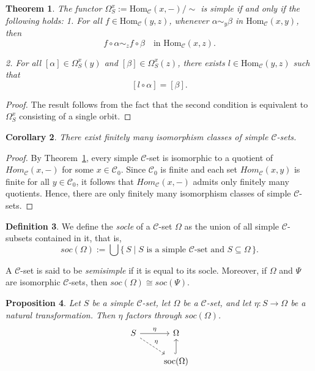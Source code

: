 \documentclass[a4paper]{article}
\newtheorem{thm}{Theorem}[section]
\newtheorem{cor}[thm]{Corollary}
\newtheorem{prop}[thm]{Proposition}
\theoremstyle{definition}
\newtheorem{defi}[thm]{Definition}
\theoremstyle{remark}
\newcommand*{\cat}[1]{\mathcal{#1}}
\begin{document}
\begin{thm} \label{simple ang quotinet}
 The functor \(\Omega_S^x := \mathrm{Hom}_{\mathcal{C}}(x,{-})/\sim\) is simple if and only if the following holds:
1. For all \(f \in \mathrm{Hom}_{\mathcal{C}}(y,z)\), whenever \(\alpha \sim_y \beta\) in \(\mathrm{Hom}_{\mathcal{C}}(x,y)\), then
\[
f \circ \alpha \sim_z f \circ \beta \quad \text{in } \mathrm{Hom}_{\mathcal{C}}(x,z).
\]

2. For all \([\alpha] \in \Omega_S^x(y)\) and \([\beta] \in \Omega_S^x(z)\), there exists \(l \in \mathrm{Hom}_{\mathcal{C}}(y,z)\) such that
\[
[l \circ \alpha] = [\beta].
\]

\end{thm}
\begin{proof}
The result follows from the fact that the second condition is equivalent to $\Omega_S^x$ consisting of a single orbit.
\end{proof}
\begin{cor}
There exist finitely many isomorphism classes of simple $\cat{C}$-sets.
\end{cor}
\begin{proof}
By Theorem~\ref{simple ang quotinet}, every simple $\cat{C}$-set is isomorphic to a quotient of \- 
$ Hom_{\cat{C}}(x,-)$ for some $x \in \cat{C}_0$. Since $\cat{C}_0$ is finite and each set $Hom_{\cat{C}}(x,y)$ is finite for all $y \in \cat{C}_0$, it follows that $Hom_{\cat{C}}(x,-)$ admits only finitely many quotients. Hence, there are only finitely many isomorphism classes of simple $\cat{C}$-sets.
\end{proof}



\begin{defi}
We define the \emph{socle} of a $\cat{C}$-set $\Omega$ as the union of all simple $\cat{C}$-subsets contained in it, that is,
\[
   soc(\Omega) := \bigcup \{\, S \mid S \text{ is a simple $\cat{C}$-set and } S \subseteq \Omega \,\}.
\]

A $\cat{C}$-set is said to be \emph{semisimple} if it is equal to its socle. Moreover, if $\Omega$ and $\Psi$ are isomorphic  $\cat{C}$-sets, then $soc(\Omega) \cong soc(\Psi)$.
\end{defi}
\begin{prop} \label{nat simple to soc}
Let $S$ be a simple $\cat{C}$-set, let $\Omega$ be a $\cat{C}$-set, and let $\eta \colon S \to \Omega$ be a natural transformation. Then $\eta$ factors through $soc(\Omega)$.
\[
\begin{tikzcd}
S \arrow[r,"\eta"] \arrow[dr,dashed,"\eta"] &
\Omega \\
&
\operatorname{soc}(\Omega) \arrow[u,hook]
\end{tikzcd}
\]
\end{prop}
\end{document}
